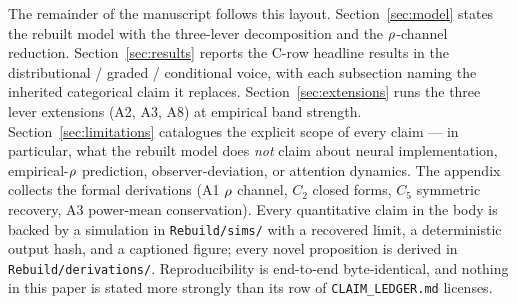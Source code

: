 The remainder of the manuscript follows this layout.
Section~\ref{sec:model} states the rebuilt model with the
three-lever decomposition and the $\rho$-channel reduction.
Section~\ref{sec:results} reports the C-row headline results in the
distributional / graded / conditional voice, with each subsection
naming the inherited categorical claim it replaces.
Section~\ref{sec:extensions} runs the three lever extensions
(A2, A3, A8) at empirical band strength.
Section~\ref{sec:limitations} catalogues the explicit scope of
every claim --- in particular, what the rebuilt model does
\emph{not} claim about neural implementation,
empirical-$\rho$ prediction, observer-deviation, or attention
dynamics.  The appendix collects the formal derivations
(A1 $\rho$ channel, $C_2$ closed forms,
$C_5$ symmetric recovery, A3 power-mean conservation).
Every quantitative claim in the body is backed by a simulation in
\texttt{Rebuild/sims/} with a recovered limit, a deterministic
output hash, and a captioned figure; every novel proposition is
derived in \texttt{Rebuild/derivations/}.  Reproducibility is
end-to-end byte-identical, and nothing in this paper is stated more
strongly than its row of \texttt{CLAIM\_LEDGER.md} licenses.
